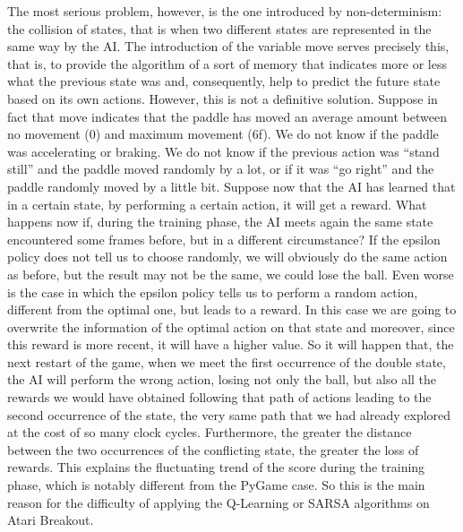 The most serious problem, however, is the one introduced by non-determinism:
the collision of states, that is when two different states are represented in
the same way by the AI. The introduction of the variable move serves precisely
this, that is, to provide the algorithm of a sort of memory that indicates
more or less what the previous state was and, consequently, help to predict
the future state based on its own actions. However, this is not a definitive
solution. Suppose in fact that move indicates that the paddle has moved an
average amount between no movement (0) and maximum movement (6f). We do not
know if the paddle was accelerating or braking. We do not know if the previous
action was ``stand still'' and the paddle moved randomly by a lot, or if it was
``go right'' and the paddle randomly moved by a little bit. Suppose now that the
AI has learned that in a certain state, by performing a certain action, it
will get a reward. What happens now if, during the training phase, the AI
meets again the same state encountered some frames before, but in a different
circumstance? If the epsilon policy does not tell us to choose randomly,
we will obviously do the same action as before, but the result may not be the
same, we could lose the ball. Even worse is the case in which the epsilon
policy tells us to perform a random action, different from the optimal one,
but leads to a reward. In this case we are going to overwrite the information
of the optimal action on that state and moreover, since this reward is more
recent, it will have a higher value. So it will happen that, the next restart
of the game, when we meet the first occurrence of the double state, the AI
will perform the wrong action, losing not only the ball, but also all the
rewards we would have obtained following that path of actions leading to the
second occurrence of the state, the very same path that we had already explored
at the cost of so many clock cycles. Furthermore, the greater the distance
between the two occurrences of the conflicting state, the greater the loss of
rewards. This explains the fluctuating trend of the score during the training
phase, which is notably different from the PyGame case. So this is the main
reason for the difficulty of applying the Q-Learning or SARSA algorithms on
Atari Breakout.
